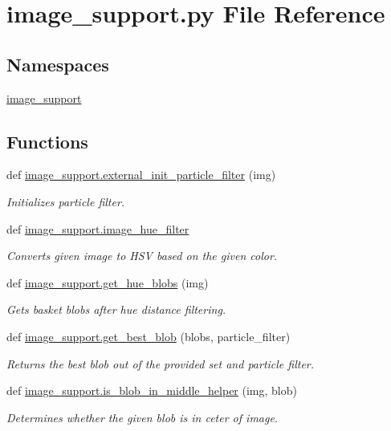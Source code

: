 \section{image\+\_\+support.\+py File Reference}
\label{image__support_8py}
\subsection*{Namespaces}
\begin{DoxyCompactItemize}
\item 
 \hyperlink{namespaceimage__support}{image\+\_\+support}
\end{DoxyCompactItemize}
\subsection*{Functions}
\begin{DoxyCompactItemize}
\item 
def \hyperlink{namespaceimage__support_a45e637a8685d23a453229102a4346327}{image\+\_\+support.\+external\+\_\+init\+\_\+particle\+\_\+filter} (img)
\begin{DoxyCompactList}\small\item\em Initializes particle filter. \end{DoxyCompactList}\item 
def \hyperlink{namespaceimage__support_aff0422e55f0d6119a012115570442c3f}{image\+\_\+support.\+image\+\_\+hue\+\_\+filter}
\begin{DoxyCompactList}\small\item\em Converts given image to H\+S\+V based on the given color. \end{DoxyCompactList}\item 
def \hyperlink{namespaceimage__support_aaa6d938c26b4ad5878e1bfb6870e749b}{image\+\_\+support.\+get\+\_\+hue\+\_\+blobs} (img)
\begin{DoxyCompactList}\small\item\em Gets basket blobs after hue distance filtering. \end{DoxyCompactList}\item 
def \hyperlink{namespaceimage__support_a0cebf9b300caec4b9e3f7725204f7f63}{image\+\_\+support.\+get\+\_\+best\+\_\+blob} (blobs, particle\+\_\+filter)
\begin{DoxyCompactList}\small\item\em Returns the best blob out of the provided set and particle filter. \end{DoxyCompactList}\item 
def \hyperlink{namespaceimage__support_ae76ebc019a04c735f46210bc29e55f76}{image\+\_\+support.\+is\+\_\+blob\+\_\+in\+\_\+middle\+\_\+helper} (img, blob)
\begin{DoxyCompactList}\small\item\em Determines whether the given blob is in ceter of image. \end{DoxyCompactList}\end{DoxyCompactItemize}
